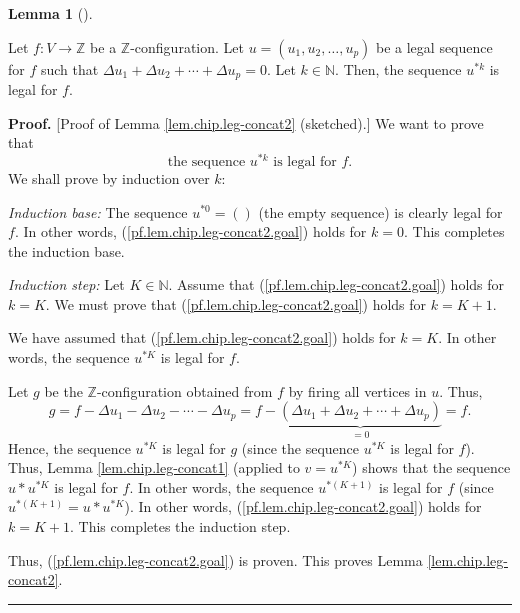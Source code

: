 \documentclass[numbers=enddot,12pt,final,onecolumn,notitlepage]{scrartcl}%
\theoremstyle{definition}
\newtheorem{lem}[theo]{Lemma}
\newenvironment{lemma}[1][]
{\begin{lem}[#1]\begin{leftbar}}
{\end{leftbar}\end{lem}}
\newenvironment{proof}[1][Proof]{\noindent\textbf{#1.} }{\ \rule{0.5em}{0.5em}}
\begin{document}
\begin{lemma}
\label{lem.chip.leg-concat2}Let $f:V\rightarrow\mathbb{Z}$ be a $\mathbb{Z}%
$-configuration. Let $u=\left(  u_{1},u_{2},\ldots,u_{p}\right)  $ be a legal
sequence for $f$ such that $\Delta u_{1}+\Delta u_{2}+\cdots+\Delta u_{p}=0$.
Let $k\in\mathbb{N}$. Then, the sequence $u^{\ast k}$ is legal for $f$.
\end{lemma}

\begin{proof}
[Proof of Lemma \ref{lem.chip.leg-concat2} (sketched).] We want to prove that%
\begin{equation}
\text{the sequence }u^{\ast k}\text{ is legal for }%
f.\label{pf.lem.chip.leg-concat2.goal}%
\end{equation}
We shall prove by induction over $k$:

\textit{Induction base:} The sequence $u^{\ast0}=\left(  {}\right)  $ (the
empty sequence) is clearly legal for $f$. In other words,
(\ref{pf.lem.chip.leg-concat2.goal}) holds for $k=0$. This completes the
induction base.

\textit{Induction step:} Let $K\in\mathbb{N}$. Assume that
(\ref{pf.lem.chip.leg-concat2.goal}) holds for $k=K$. We must prove that
(\ref{pf.lem.chip.leg-concat2.goal}) holds for $k=K+1$.

We have assumed that (\ref{pf.lem.chip.leg-concat2.goal}) holds for $k=K$. In
other words, the sequence $u^{\ast K}$ is legal for $f$.

Let $g$ be the $\mathbb{Z}$-configuration obtained from $f$ by firing all
vertices in $u$. Thus,
\[
g=f-\Delta u_{1}-\Delta u_{2}-\cdots-\Delta u_{p}=f-\underbrace{\left(  \Delta
u_{1}+\Delta u_{2}+\cdots+\Delta u_{p}\right)  }_{=0}=f.
\]
Hence, the sequence $u^{\ast K}$ is legal for $g$ (since the sequence $u^{\ast
K}$ is legal for $f$). Thus, Lemma \ref{lem.chip.leg-concat1} (applied to
$v=u^{\ast K}$) shows that the sequence $u\ast u^{\ast K}$ is legal for $f$.
In other words, the sequence $u^{\ast\left(  K+1\right)  }$ is legal for $f$
(since $u^{\ast\left(  K+1\right)  }=u\ast u^{\ast K}$). In other words,
(\ref{pf.lem.chip.leg-concat2.goal}) holds for $k=K+1$. This completes the
induction step.

Thus, (\ref{pf.lem.chip.leg-concat2.goal}) is proven. This proves Lemma
\ref{lem.chip.leg-concat2}.
\end{proof}
\end{document}
